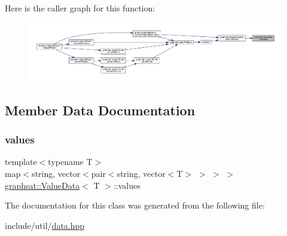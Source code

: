Here is the caller graph for this function\+:
\nopagebreak
\begin{figure}[H]
\begin{center}
\leavevmode
\includegraphics[width=350pt]{classgraphsat_1_1_value_data_a5a2ec95b007418d2c4278d68b4b567d6_icgraph}
\end{center}
\end{figure}


\subsection{Member Data Documentation}
\mbox{\label{classgraphsat_1_1_value_data_a896ab3d64dda9a631d60e0dca55ad90e}} 
\subsubsection{\texorpdfstring{values}{values}}
{\footnotesize\ttfamily template$<$typename T$>$ \\
map$<$string, vector$<$pair$<$string, vector$<$T$>$ $>$ $>$ $>$ \mbox{\hyperlink{classgraphsat_1_1_value_data}{graphsat\+::\+Value\+Data}}$<$ T $>$\+::values\hspace{0.3cm}{\ttfamily [private]}}



The documentation for this class was generated from the following file\+:\begin{DoxyCompactItemize}
\item 
include/util/\mbox{\hyperlink{data_8hpp}{data.\+hpp}}\end{DoxyCompactItemize}
